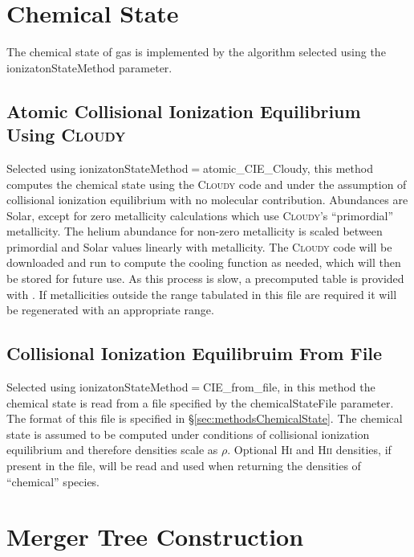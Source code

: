 \section{Chemical State}\label{sec:ChemicalStateMethod}

The chemical state of gas is implemented by the algorithm selected using the {\normalfont \ttfamily ionizatonStateMethod} parameter.

\subsection{Atomic Collisional Ionization Equilibrium Using {\normalfont \scshape Cloudy}}

Selected using {\normalfont \ttfamily ionizatonStateMethod}$=${\normalfont \ttfamily atomic\_CIE\_Cloudy}, this method computes the chemical state using the {\normalfont \scshape Cloudy} code and under the assumption of collisional ionization equilibrium with no molecular contribution. Abundances are Solar, except for zero metallicity calculations which use {\normalfont \scshape Cloudy}'s ``primordial'' metallicity. The helium abundance for non-zero metallicity is scaled between primordial and Solar values linearly with metallicity. The {\normalfont \scshape Cloudy} code will be downloaded and run to compute the cooling function as needed, which will then be stored for future use. As this process is slow, a precomputed table is provided with \glc. If metallicities outside the range tabulated in this file are required it will be regenerated with an appropriate range.

\subsection{Collisional Ionization Equilibruim From File}

Selected using {\normalfont \ttfamily ionizatonStateMethod}$=${\normalfont \ttfamily CIE\_from\_file}, in this method the chemical state is read from a file specified by the {\normalfont \ttfamily chemicalStateFile} parameter. The format of this file is specified in \S\ref{sec:methodsChemicalState}. The chemical state is assumed to be computed under conditions of collisional ionization equilibrium and therefore densities scale as $\rho$. Optional H{\normalfont \scshape i} and H{\normalfont \scshape ii} densities, if present in the file, will be read and used when returning the densities of ``chemical'' species.

\section{Merger Tree Construction}

